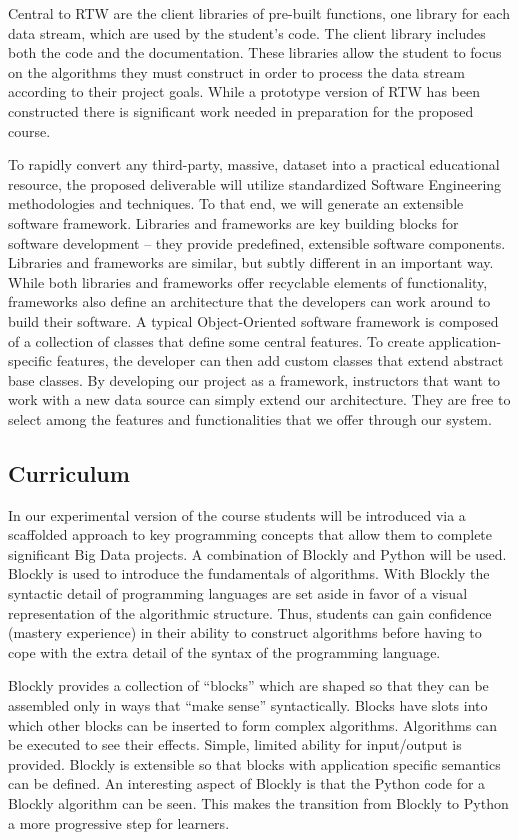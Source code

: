 \documentclass[11pt]{article}
\begin{document}
Central to RTW are the client libraries of pre-built functions, one library for each data stream, which are used by the student’s code. The client library includes both the code and the documentation.  These libraries allow the student to focus on the algorithms they must construct in order to process the data stream according to their project goals. While a prototype version of RTW has been constructed there is significant work needed in preparation for the proposed course. 

To rapidly convert any third-party, massive, dataset into a practical educational resource, the proposed deliverable will utilize standardized Software Engineering methodologies and techniques. To that end, we will generate an extensible software framework.  Libraries and frameworks are key building blocks for software development -- they provide predefined, extensible software components.  Libraries and frameworks are similar, but subtly different in an important way.  While both libraries and frameworks offer recyclable elements of functionality, frameworks also define an architecture that the developers can work around to build their software. A typical Object-Oriented software framework is composed of a collection of classes that define some central features. To create application-specific features, the developer can then add custom classes that extend abstract base classes. By developing our project as a framework, instructors that want to work with a new data source can simply extend our architecture.
They are free to select among the features and functionalities that we offer through our system.

\subsection{Curriculum}

In our experimental version of the course students will be introduced via a scaffolded approach to key programming concepts that allow them to complete significant Big Data projects. A combination of Blockly \cite{blockly} and Python will be used.
Blockly is used to introduce the fundamentals of algorithms. With Blockly the syntactic detail of programming languages are set aside in favor of a visual representation of the algorithmic structure. Thus, students can gain confidence (mastery experience) in their ability to construct algorithms before having to cope with the extra detail of the syntax of the programming language.

Blockly provides a collection of ``blocks'' which are shaped so that they can be assembled only in ways that ``make sense'' syntactically. Blocks have slots into which other blocks can be inserted to form complex algorithms. Algorithms can be executed to see their effects. Simple, limited ability for input/output is provided. Blockly is extensible so that blocks with application specific semantics can be defined. An interesting aspect of Blockly is that the Python code for a Blockly algorithm can be seen. This makes the transition from Blockly to Python a more progressive step for learners.
\end{document}
